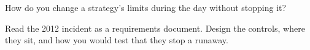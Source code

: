\begin{interviewq}\label{iq:ll:pre-trade-risk-and-kill-switches:5}
How do you change a strategy's limits during the day without stopping it?
\end{interviewq}

\begin{interviewq}\label{iq:ll:pre-trade-risk-and-kill-switches:6}
Read the 2012 incident as a requirements document. Design the controls, where they sit, and how you would test that they stop a
runaway.
\end{interviewq}
